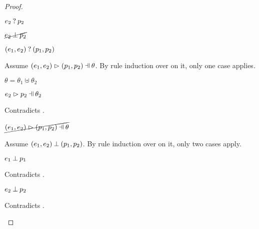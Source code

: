 \begin{proof}
\begin{byCases}
\begin{byCases}
\begin{byCases}
\begin{pfsteps*}
            \item $e_2 \mathbin{?} p_2$  
            \item $\cancel{e_2 \mathbin{\bot} p_2}$  
            \item $(e_1 , e_2) \mathbin{?} (p_1 , p_2)$ 
            \end{pfsteps*}
            Assume $\hpatmatch{\hpair{e_1}{e_2}}{\hpair{p_1}{p_2}}{\theta}$. By rule induction over  on it, only one case applies.
            \begin{byCases}
            \item[\text{(\ref{rule:MPair})}]
                \begin{pfsteps*}
                \item $\theta=\theta_1\uplus\theta_2$
                \item $\hpatmatch{e_2}{p_2}{\theta_2}$ 
                \end{pfsteps*}
                Contradicts .
            \end{byCases}
            \begin{pfsteps*}
            \item $\cancel{\hpatmatch{\hpair{e_1}{e_2}}{\hpair{p_1}{p_2}}{\theta}}$ 
            \end{pfsteps*}
            Assume $(e_1 , e_2) \mathbin{\bot} (p_1 , p_2)$. By rule induction over  on it, only two cases apply.
            \begin{byCases}
            \item[\text{(\ref{rule:NMPairL})}]
                \begin{pfsteps*}
                \item $e_1 \mathbin{\bot} p_1$ 
                \end{pfsteps*}
                Contradicts .
            \item[\text{(\ref{rule:NMPairR})}]
                \begin{pfsteps*}
                \item $e_2 \mathbin{\bot} p_2$ 
                \end{pfsteps*}
                Contradicts .

\end{byCases}
\end{byCases}
\end{byCases}
\end{byCases}
\end{proof}
